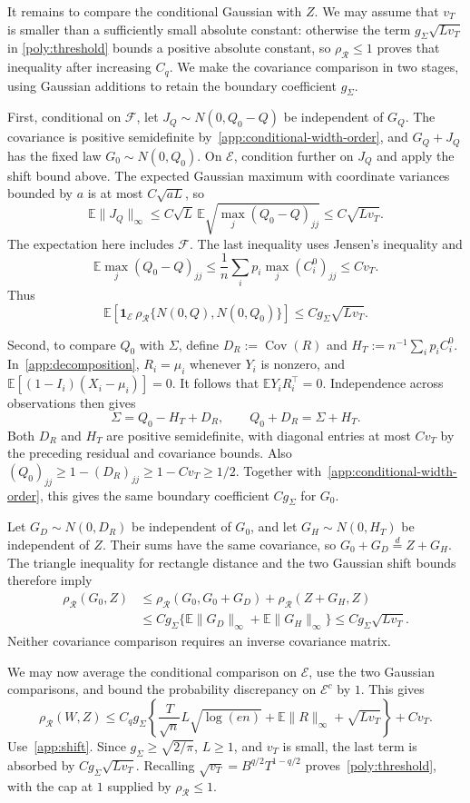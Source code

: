 \documentclass[11pt,letterpaper,twoside,leqno]{article}
\theoremstyle{bookplain}
\theoremstyle{bookremark}
\newcommand{\E}{\mathbb E}
\newcommand{\Cov}{\operatorname{Cov}}
\newcommand{\rh}{\rho_{\mathcal R}}
\newcommand{\ind}{\mathbf 1}
\begin{document}
It remains to compare the conditional Gaussian with $Z$. We may
assume that $v_T$ is smaller than a sufficiently small absolute
constant: otherwise the term $g_\Sigma\sqrt{Lv_T}$ in
\eqref{poly:threshold} bounds a positive absolute constant, so
$\rh\le1$ proves that inequality after increasing $C_q$.
We make the covariance comparison in two stages, using Gaussian
additions to retain the boundary coefficient $g_\Sigma$.

First, conditional on $\mathcal F$, let
$J_Q\sim N(0,Q_0-Q)$ be independent of $G_Q$. The covariance is
positive semidefinite by~\eqref{app:conditional-width-order}, and
$G_Q+J_Q$ has the fixed law $G_0\sim N(0,Q_0)$. On
$\mathcal E$, condition further on $J_Q$ and apply the shift
bound above. The expected Gaussian maximum with coordinate
variances bounded by $a$ is at most $C\sqrt{aL}$, so
\[
 \E\|J_Q\|_\infty
 \le C\sqrt L\,\E\sqrt{\max_j(Q_0-Q)_{jj}}
 \le C\sqrt{Lv_T}.
\]
The expectation here includes $\mathcal F$. The last inequality
uses Jensen's inequality and
\[
 \E\max_j(Q_0-Q)_{jj}
 \le\frac1n\sum_i p_i\max_j(C_i^0)_{jj}\le Cv_T.
\]
Thus
\[
 \E\!\left[\ind_{\mathcal E}\,
     \rh\{N(0,Q),N(0,Q_0)\}\right]
 \le Cg_\Sigma\sqrt{Lv_T}.
\]

Second, to compare $Q_0$ with $\Sigma$, define
$D_R:=\Cov(R)$ and $H_T:=n^{-1}\sum_i p_iC_i^0$.
In~\eqref{app:decomposition}, $R_i=\mu_i$ whenever $Y_i$ is
nonzero, and $\E[(1-I_i)(X_i-\mu_i)]=0$. It follows that
$\E Y_iR_i^\top=0$. Independence across observations then gives
\[
 \Sigma=Q_0-H_T+D_R,\qquad Q_0+D_R=\Sigma+H_T.
\]
Both $D_R$ and $H_T$ are positive semidefinite, with diagonal
entries at most $Cv_T$ by the preceding residual and covariance
bounds. Also $(Q_0)_{jj}\ge1-(D_R)_{jj}\ge1-Cv_T\ge1/2$.
Together with~\eqref{app:conditional-width-order}, this gives
the same boundary coefficient $Cg_\Sigma$ for $G_0$.

Let $G_D\sim N(0,D_R)$ be independent of $G_0$, and let
$G_H\sim N(0,H_T)$ be independent of $Z$. Their sums have the
same covariance, so $G_0+G_D\stackrel d=Z+G_H$. The triangle
inequality for rectangle distance and the two Gaussian shift
bounds therefore imply
\[
 \begin{split}
 \rh(G_0,Z)
 &\le\rh(G_0,G_0+G_D)+\rh(Z+G_H,Z)\\
 &\le Cg_\Sigma\{\E\|G_D\|_\infty+\E\|G_H\|_\infty\}
 \le Cg_\Sigma\sqrt{Lv_T}.
 \end{split}
\]
Neither covariance comparison requires an inverse covariance matrix.

We may now average the conditional comparison on $\mathcal E$,
use the two Gaussian comparisons, and bound the probability
discrepancy on $\mathcal E^c$ by $1$. This gives
\[
 \rh(W,Z)\le C_qg_\Sigma\left\{
 \frac{T}{\sqrt n}L\sqrt{\log(en)}
 +\E\|R\|_\infty+\sqrt{Lv_T}\right\}+Cv_T.
\]
Use~\eqref{app:shift}. Since $g_\Sigma\ge\sqrt{2/\pi}$,
$L\ge1$, and $v_T$ is small, the last term is absorbed by
$Cg_\Sigma\sqrt{Lv_T}$. Recalling
$\sqrt{v_T}=B^{q/2}T^{1-q/2}$ proves~\eqref{poly:threshold},
with the cap at $1$ supplied by $\rh\le1$.
\end{document}
